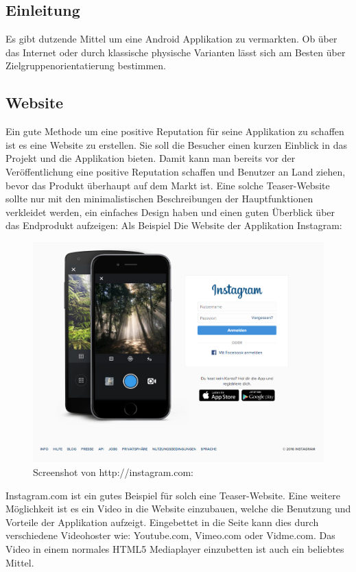 \documentclass[FIPLY_base.tex]{subfiles}
\author{Daniel Bersenkowitsch}
\date{25. Februar 2016}
\begin{document}
\subsection{Einleitung}
Es gibt dutzende Mittel um eine Android Applikation zu vermarkten. Ob über das Internet oder durch klassische physische Varianten lässt sich am Besten über Zielgruppenorientatierung bestimmen. 

\subsection{Website}
Ein gute Methode um eine positive Reputation für seine Applikation zu schaffen ist es eine Website zu erstellen. Sie soll die Besucher einen kurzen Einblick in das Projekt und die Applikation bieten. Damit kann man bereits vor der Veröffentlichung eine positive Reputation schaffen und Benutzer an Land ziehen, bevor das Produkt überhaupt auf dem Markt ist. Eine solche Teaser-Website sollte nur mit den minimalistischen Beschreibungen der Hauptfunktionen verkleidet werden, ein einfaches Design haben und einen guten Überblick über das Endprodukt aufzeigen: Als Beispiel Die Website der Applikation Instagram:

\begin{figure}[h]
	\centering
	\includegraphics[scale=0.3]{img/instagramdotcom}
	\caption{Screenshot von http://instagram.com:}
\end{figure}

Instagram.com ist ein gutes Beispiel für solch eine Teaser-Website. 
Eine weitere Möglichkeit ist es ein Video in die Website einzubauen, welche die Benutzung und Vorteile der Applikation aufzeigt. Eingebettet in die Seite kann dies durch verschiedene Videohoster wie: Youtube.com, Vimeo.com oder Vidme.com. Das Video in einem normales HTML5 Mediaplayer einzubetten ist auch ein beliebtes Mittel.
\end{document}
